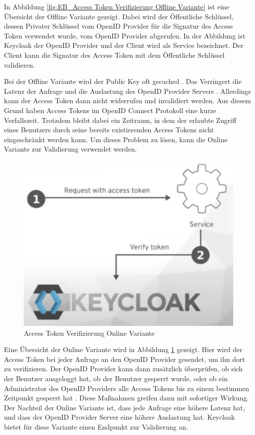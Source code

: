 In Abbildung \ref{fig:EB_Access Token Verifizierung Offline Variante} ist eine Übersicht der Offline Variante gezeigt. Dabei wird der Öffentliche Schlüssel, dessen Privater Schlüssel vom OpenID Provider für die Signatur des Access Token verwendet wurde, vom OpenID Provider abgerufen. In der Abbildung ist Keycloak der OpenID Provider und der Client wird als Service bezeichnet. Der Client kann die Signatur des Access Token mit dem Öffentliche Schlüssel validieren.

Bei der Offline Variante wird der Public Key oft gecached \cite{EB32}. Das Verringert die Latenz der Anfrage und die Auslastung des OpenID Provider Servers \cite{EB32}. Allerdings kann der Access Token dann nicht widerrufen und invalidiert werden. Aus diesem Grund haben Access Tokens im OpenID Connect Protokoll eine kurze Verfallszeit. Trotzdem bleibt dabei ein Zeitraum, in dem der erlaubte Zugriff eines Benutzers durch seine bereits existierenden Access Tokens nicht eingeschränkt werden kann. Um dieses Problem zu lösen, kann die Online Variante zur Validierung verwendet werden. %

\begin{figure}[!ht]
	\centering
	\includegraphics[width=.6\textwidth]{Images/Ebert/VerifyAccessTokenOnline.PNG}
	\caption{Access Token Verifizierung Online Variante \cite{EB32}}
	\label{fig:EB_Access Token Verifizierung Online Variante}
\end{figure}

Eine Übersicht der Online Variante wird in Abbildung \ref{fig:EB_Access Token Verifizierung Online Variante} gezeigt. Hier wird der Access Token bei jeder Anfrage an den OpenID Provider gesendet, um ihn dort zu verifizieren. Der OpenID Provider kann dann zusätzlich überprüfen, ob sich der Benutzer ausgeloggt hat, ob der Benutzer gesperrt wurde, oder ob ein Administrator des OpenID Providers alle Access Tokens bis zu einem bestimmen Zeitpunkt gesperrt hat \cite{EB32}. Diese Maßnahmen greifen dann mit sofortiger Wirkung. Der Nachteil der Online Variante ist, dass jede Anfrage eine höhere Latenz hat, und dass der OpenID Provider Server eine höhere Auslastung hat. Keycloak bietet für diese Variante einen Endpunkt zur Validierung an. 

